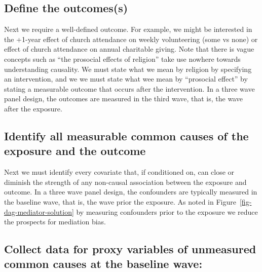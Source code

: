 \documentclass[
  singlecolumn]{report}
\begin{document}
\hypertarget{define-the-outcomess}{%
\subsection{\texorpdfstring{\textbf{Define the
outcomes(s)}}{Define the outcomes(s)}}\label{define-the-outcomess}}

Next we require a well-defined outcome. For example, we might be
interested in the +1-year effect of church attendance on weekly
volunteering (some vs none) or effect of church attendance on annual
charitable giving. Note that there is vague concepts such as ``the
prosocial effects of religion'' take use nowhere towards understanding
causality. We must state what we mean by religion by specifying an
intervention, and we we must state what wee mean by ``prosocial effect''
by stating a measurable outcome that occurs after the intervention. In a
three wave panel design, the outcomes are measured in the third wave,
that is, the wave after the exposure.

\hypertarget{identify-all-measurable-common-causes-of-the-exposure-and-the-outcome}{%
\subsection{\texorpdfstring{\textbf{Identify all measurable common
causes of the exposure and the
outcome}}{Identify all measurable common causes of the exposure and the outcome}}\label{identify-all-measurable-common-causes-of-the-exposure-and-the-outcome}}

Next we must identify every covariate that, if conditioned on, can close
or diminish the strength of any non-causal association between the
exposure and outcome. In a three wave panel design, the confounders are
typically measured in the baseline wave, that is, the wave prior the
exposure. As noted in Figure~\ref{fig-dag-mediator-solution} by
measuring confounders prior to the exposure we reduce the prospects for
mediation bias.

\hypertarget{collect-data-for-proxy-variables-of-unmeasured-common-causes-at-the-baseline-wave}{%
\subsection{\texorpdfstring{\textbf{Collect data for proxy variables of
unmeasured common causes at the baseline
wave}:}{Collect data for proxy variables of unmeasured common causes at the baseline wave:}}\label{collect-data-for-proxy-variables-of-unmeasured-common-causes-at-the-baseline-wave}}
\end{document}
